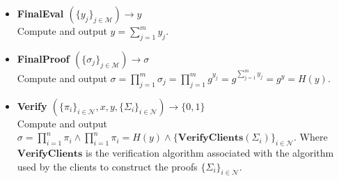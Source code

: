 \begin{algorithm}
\begin{itemize}
\item\textbf{FinalEval $(\{y_j\}_{j\in\mathcal{M}})\xrightarrow[]{}y$}\\
Compute and output $y = \sum_{j=1}^m y_{j}$.

\item\textbf{FinalProof $(\{\sigma_j\}_{j\in\mathcal{M}})\xrightarrow[]{}\sigma$}\\
Compute and output $\sigma = \prod_{j=1}^m \sigma_j = \prod_{j=1}^m g^{y_{j}} =  g^{\sum_{j=1}^m y_{j}}= g^{y}=H(y)$.

\item\textbf{Verify $(\{\pi_i\}_{i\in\mathcal{N}},x,y,\{\Sigma_i\}_{i\in\mathcal{N}})\xrightarrow[]{}\{0,1\}$}\\
Compute and output $\sigma= \prod_{i=1}^n \pi_i \wedge \prod_{i=1}^n \pi_i = H(y)\wedge \{\textbf{VerifyClients}( \Sigma_i) \}_{i\in\mathcal{N}}$. Where $\textbf{VerifyClients}$ is the verification algorithm associated with the algorithm used by the clients to construct the proofs $\{\Sigma_i\}_{i\in\mathcal{N}}$.
\end{itemize}
\label{alg:VAHSS-HSS-RP}
\end{algorithm}

